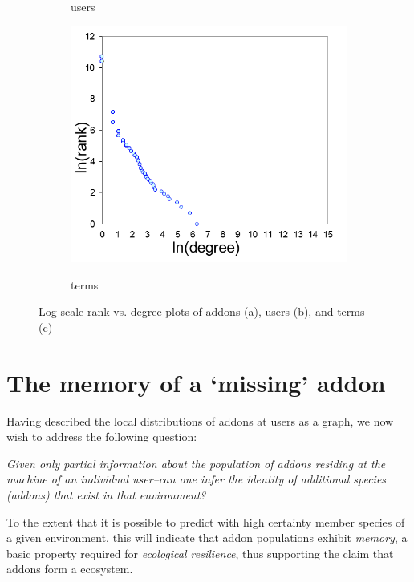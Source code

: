 \documentclass[ijoc,nonblindrev]{informs3} %
\numberwithin{equation}{subsection}
\begin{document}
\begin{figure}[t]
\begin{subfigure}[b]{0.30\textwidth}
\caption{users} 
\label{fig:power_law_addons}
\end{subfigure}
\begin{subfigure}[b]{0.30\textwidth}
	\centering
\includegraphics[scale=0.30]{figures/zipf-terms1.png} \\
\caption{terms}
\end{subfigure}
\caption{Log-scale rank vs. degree plots of addons (a), users (b), and terms (c)}
	\label{fig:zipf}
\end{figure}

\section{The memory of a `missing' addon}
\label{chap:user_ecosystem}


Having described the local distributions of addons at users as a graph, we now wish to address the following question:

{\it Given only partial information about the population of addons residing at the machine of an individual user--can one infer the identity of additional species (addons) that exist in that environment?}

To the extent that it is possible to predict with high certainty member species of a given environment, this will indicate that addon populations exhibit {\it memory}, a basic property required for {\it ecological resilience}, thus supporting the claim that addons form a ecosystem. 
\end{document}
